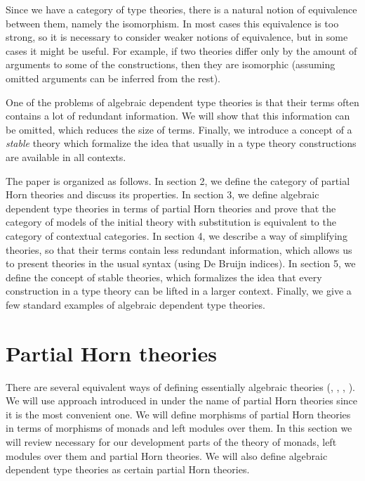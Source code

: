 \documentclass[reqno]{amsart}
\theoremstyle{definition}
\theoremstyle{remark}
\numberwithin{figure}{section}
\begin{document}
Since we have a category of type theories, there is a natural notion of equivalence between them, namely the isomorphism.
In most cases this equivalence is too strong, so it is necessary to consider weaker notions of equivalence, but in some cases it might be useful.
For example, if two theories differ only by the amount of arguments to some of the constructions,
then they are isomorphic (assuming omitted arguments can be inferred from the rest).

One of the problems of algebraic dependent type theories is that their terms often contains a lot of redundant information.
We will show that this information can be omitted, which reduces the size of terms.
Finally, we introduce a concept of a \emph{stable} theory which formalize the idea that usually in a type theory constructions are available in all contexts.

The paper is organized as follows.
In section 2, we define the category of partial Horn theories and discuss its properties.
In section 3, we define algebraic dependent type theories in terms of partial Horn theories and prove that the category of models of the initial theory with substitution is equivalent to the category of contextual categories.
In section 4, we describe a way of simplifying theories, so that their terms contain less redundant information,
    which allows us to present theories in the usual syntax (using De Bruijn indices).
In section 5, we define the concept of stable theories, which formalizes the idea that every construction in a type theory can be lifted in a larger context.
Finally, we give a few standard examples of algebraic dependent type theories.

\section{Partial Horn theories}
\label{sec:PHT}

There are several equivalent ways of defining essentially algebraic theories (\cite{LPC}, \cite{GAT}, \cite{PHL}, \cite[D 1.3.4]{elephant}).
We will use approach introduced in \cite{PHL} under the name of partial Horn theories since it is the most convenient one.
We will define morphisms of partial Horn theories in terms of morphisms of monads and left modules over them.
In this section we will review necessary for our development parts of the theory of monads, left modules over them and partial Horn theories.
We will also define algebraic dependent type theories as certain partial Horn theories.
\end{document}
